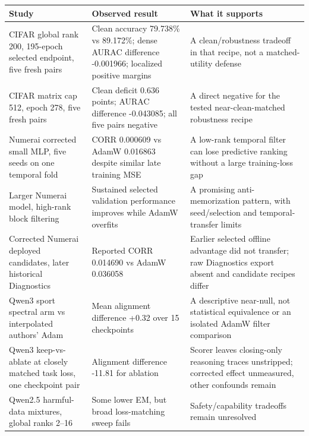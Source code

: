 \documentclass[
  british,
  10pt,
  a4paper,
]{article}
\newcounter{none} %
\begin{document}
{\def\LTcaptype{none} %
\begin{longtable}[]{@{}
  >{\raggedright\arraybackslash}p{}
  >{\raggedright\arraybackslash}p{}
  >{\raggedright\arraybackslash}p{}@{}}
\toprule\noalign{}
\begin{minipage}[b]{\linewidth}\raggedright
Study
\end{minipage} & \begin{minipage}[b]{\linewidth}\raggedright
Observed result
\end{minipage} & \begin{minipage}[b]{\linewidth}\raggedright
What it supports
\end{minipage} \\
\midrule\noalign{}
\endhead
\bottomrule\noalign{}
\endlastfoot
CIFAR global rank 200, 195-epoch selected endpoint, five fresh pairs &
Clean accuracy 79.738\% vs 89.172\%; dense AURAC difference -0.001966;
localized positive margins & A clean/\allowbreak{}robustness tradeoff in
that recipe, not a matched-\allowbreak{}utility defense \\
CIFAR matrix cap 512, epoch 278, five fresh pairs & Clean deficit 0.636
points; AURAC difference -0.043085; all five pairs negative & A direct
negative for the tested near-\allowbreak{}clean-\allowbreak{}matched
robustness recipe \\
Numerai corrected small MLP, five seeds on one temporal fold & CORR
0.000609 vs AdamW 0.016863 despite similar late training MSE & A
low-rank temporal filter can lose predictive ranking without a large
training-\allowbreak{}loss gap \\
Larger Numerai model, high-rank block filtering & Sustained selected
validation performance improves while AdamW overfits & A promising
anti-\allowbreak{}memorization\allowbreak{} pattern, with
seed/\allowbreak{}selection and temporal-\allowbreak{}transfer limits \\
Corrected Numerai deployed candidates,\allowbreak{} later historical
Diagnostics & Reported CORR 0.014690 vs AdamW 0.036058 & Earlier
selected offline advantage did not transfer; raw Diagnostics export
absent and candidate recipes differ \\
Qwen3 sport spectral arm vs interpolated authors' Adam & Mean alignment
difference +0.32 over 15 checkpoints & A descriptive near-null, not
statistical equivalence or an isolated AdamW filter comparison \\
Qwen3 keep-\allowbreak{}vs-\allowbreak{}ablate at closely matched task
loss, one checkpoint pair & Alignment difference -11.81 for ablation &
Scorer leaves closing-\allowbreak{}only reasoning traces unstripped;
corrected effect unmeasured,\allowbreak{} other confounds remain \\
Qwen2.5 harmful-\allowbreak{}data mixtures, global ranks 2--16 & Some
lower EM, but broad loss-\allowbreak{}matching sweep fails &
Safety/\allowbreak{}capability tradeoffs remain unresolved \\
\end{longtable}
}
\end{document}
